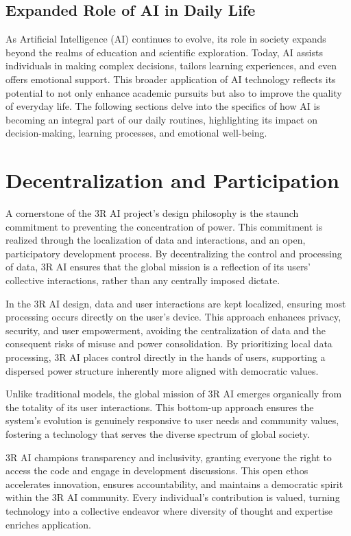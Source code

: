 \documentclass[12pt]{article}
\begin{document}
\subsection*{Expanded Role of AI in Daily Life}
As Artificial Intelligence (AI) continues to evolve, its role in society expands beyond the realms of education and scientific exploration. Today, AI assists individuals in making complex decisions, tailors learning experiences, and even offers emotional support. This broader application of AI technology reflects its potential to not only enhance academic pursuits but also to improve the quality of everyday life. The following sections delve into the specifics of how AI is becoming an integral part of our daily routines, highlighting its impact on decision-making, learning processes, and emotional well-being.


\section*{Decentralization and Participation}

A cornerstone of the 3R AI project's design philosophy is the staunch commitment to preventing the concentration of power. This commitment is realized through the localization of data and interactions, and an open, participatory development process. By decentralizing the control and processing of data, 3R AI ensures that the global mission is a reflection of its users' collective interactions, rather than any centrally imposed dictate.

In the 3R AI design, data and user interactions are kept localized, ensuring most processing occurs directly on the user's device. This approach enhances privacy, security, and user empowerment, avoiding the centralization of data and the consequent risks of misuse and power consolidation. By prioritizing local data processing, 3R AI places control directly in the hands of users, supporting a dispersed power structure inherently more aligned with democratic values.

Unlike traditional models, the global mission of 3R AI emerges organically from the totality of its user interactions. This bottom-up approach ensures the system's evolution is genuinely responsive to user needs and community values, fostering a technology that serves the diverse spectrum of global society.

3R AI champions transparency and inclusivity, granting everyone the right to access the code and engage in development discussions. This open ethos accelerates innovation, ensures accountability, and maintains a democratic spirit within the 3R AI community. Every individual's contribution is valued, turning technology into a collective endeavor where diversity of thought and expertise enriches application.
\end{document}
